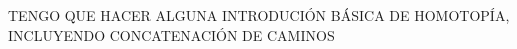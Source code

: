 \documentclass[bibtex, anon]{TEMat-article}
\begin{document}
TENGO QUE HACER ALGUNA INTRODUCIÓN BÁSICA DE HOMOTOPÍA, INCLUYENDO CONCATENACIÓN DE CAMINOS
%
%
\end{document}
